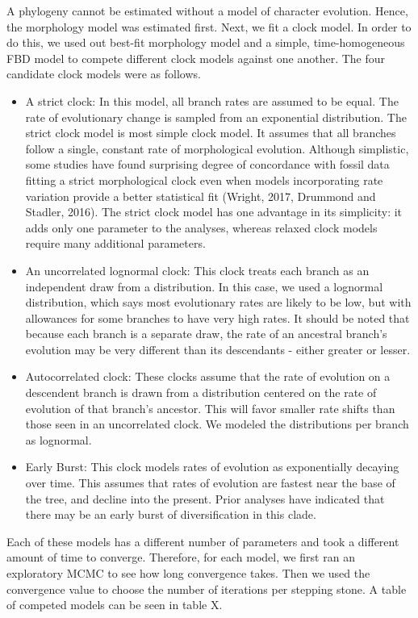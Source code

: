 \documentclass{article}
\begin{document}
A phylogeny cannot be estimated without a model of character evolution. 
Hence, the morphology model was estimated first.
Next, we fit a clock model. 
In order to do this, we used out best-fit morphology model and a simple, time-homogeneous FBD model to compete different clock models against one another.
The four candidate clock models were as follows.
\begin{itemize}
    \item A strict clock: In this model, all branch rates are assumed to be equal. The rate of evolutionary change is sampled from an exponential distribution. The strict clock model is most simple clock model. It assumes that all branches follow a single, constant rate of morphological evolution. Although simplistic, some studies have found surprising degree of concordance with fossil data fitting a strict morphological clock even when models incorporating rate variation provide a better statistical fit (Wright, 2017, Drummond and Stadler, 2016). The strict clock model has one advantage in its simplicity: it adds only one parameter to the analyses, whereas relaxed clock models require many additional parameters.
    \item An uncorrelated lognormal clock: This clock treats each branch as an independent draw from a distribution.  In this case, we used a lognormal distribution, which says most evolutionary rates are likely to be low, but with allowances for some branches to have very high rates. It should be noted that because each branch is a separate draw, the rate of an ancestral branch's evolution may be very different than its descendants - either greater or lesser.
    \item Autocorrelated clock: These clocks assume that the rate of evolution on a descendent branch is drawn from a distribution centered on the rate of evolution of that branch's ancestor. This will favor smaller rate shifts than those seen in an uncorrelated clock. We modeled the distributions per branch as lognormal.
    \item Early Burst: This clock models rates of evolution as exponentially decaying over time. This assumes that rates of evolution are fastest near the base of the tree, and decline into the present. Prior analyses have indicated that there may be an early burst of diversification in this clade.
\end{itemize}

Each of these models has a different number of parameters and took a different amount of time to converge. Therefore, for each model, we first ran an exploratory MCMC to see how long convergence takes. Then we used the convergence value to choose the number of iterations per stepping stone.
A table of competed models can be seen in table X.
\end{document}
